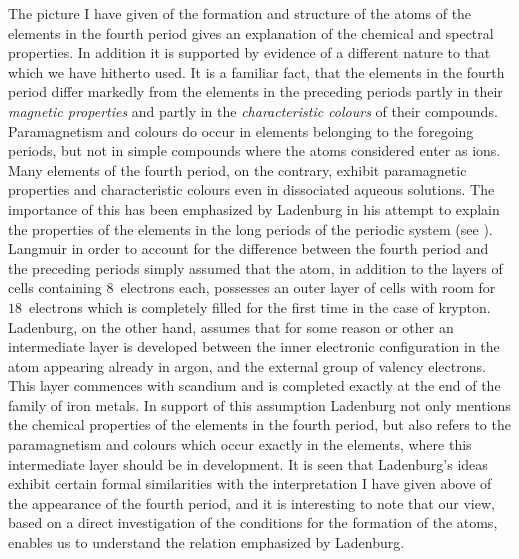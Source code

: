 The picture I have given of the formation and structure of the
atoms of the elements in the fourth period gives an explanation of
the chemical and spectral properties. In addition it is supported
by evidence of a different nature to that which we have hitherto
used. It is a familiar fact, that the elements in the fourth period
differ markedly from the elements in the preceding periods
partly in their \emph{magnetic properties} and partly in the \emph{characteristic
colours} of their compounds. Paramagnetism and colours do occur
in elements belonging to the foregoing periods, but not in simple
compounds where the atoms considered enter as ions. Many
elements of the fourth period, on the contrary, exhibit paramagnetic
properties and characteristic colours even in dissociated
aqueous solutions. The importance of this has been emphasized
by Ladenburg in his attempt to explain the properties of the
elements in the long periods of the periodic system (see ).
Langmuir in order to account for the difference between the fourth
period and the preceding periods simply assumed that the atom,
in addition to the layers of cells containing $8$~electrons each, possesses
an outer layer of cells with room for $18$~electrons which is completely
filled for the first time in the case of krypton. Ladenburg,
on the other hand, assumes that for some reason or other an
intermediate layer is developed between the inner electronic
configuration in the atom appearing already in argon, and the
external group of valency electrons. This layer commences with
scandium and is completed exactly at the end of the family of iron
metals. In support of this assumption Ladenburg not only mentions
the chemical properties of the elements in the fourth period, but
also refers to the paramagnetism and colours which occur exactly
in the elements, where this intermediate layer should be in
development. It is seen that Ladenburg's ideas exhibit certain
formal similarities with the interpretation I have given above of
the appearance of the fourth period, and it is interesting to note that
our view, based on a direct investigation of the conditions for the
formation of the atoms, enables us to understand the relation
emphasized by Ladenburg.

